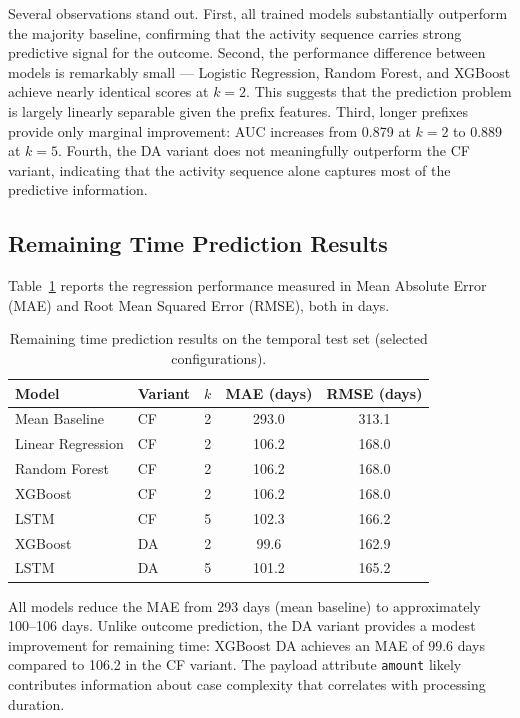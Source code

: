 Several observations stand out. First, all trained models substantially outperform the majority baseline, confirming that the activity sequence carries strong predictive signal for the outcome. Second, the performance difference between models is remarkably small — Logistic Regression, Random Forest, and XGBoost achieve nearly identical scores at $k=2$. This suggests that the prediction problem is largely linearly separable given the prefix features. Third, longer prefixes provide only marginal improvement: AUC increases from 0.879 at $k=2$ to 0.889 at $k=5$. Fourth, the DA variant does not meaningfully outperform the CF variant, indicating that the activity sequence alone captures most of the predictive information.

\subsection{Remaining Time Prediction Results}

Table~\ref{tab:remaining_results} reports the regression performance measured in Mean Absolute Error (MAE) and Root Mean Squared Error (RMSE), both in days.

\begin{table}[H]
\centering
\begin{tabular}{llccc}
\toprule
\textbf{Model} & \textbf{Variant} & \textbf{$k$} & \textbf{MAE (days)} & \textbf{RMSE (days)} \\
\midrule
Mean Baseline & CF & 2 & 293.0 & 313.1 \\
Linear Regression & CF & 2 & 106.2 & 168.0 \\
Random Forest & CF & 2 & 106.2 & 168.0 \\
XGBoost & CF & 2 & 106.2 & 168.0 \\
LSTM & CF & 5 & 102.3 & 166.2 \\
\midrule
XGBoost & DA & 2 & 99.6 & 162.9 \\
LSTM & DA & 5 & 101.2 & 165.2 \\
\bottomrule
\end{tabular}
\caption{Remaining time prediction results on the temporal test set (selected configurations).}
\label{tab:remaining_results}
\end{table}

All models reduce the MAE from 293 days (mean baseline) to approximately 100–106 days. Unlike outcome prediction, the DA variant provides a modest improvement for remaining time: XGBoost DA achieves an MAE of 99.6 days compared to 106.2 in the CF variant. The payload attribute \texttt{amount} likely contributes information about case complexity that correlates with processing duration.

